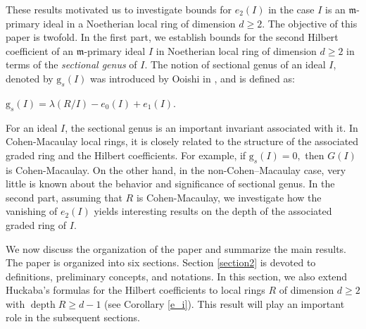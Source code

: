 \documentclass[reqno,a4paper,dvipsnames]{amsart}
\newcommand{\m}{\mathfrak{m} }
\newcommand{\depth}{\operatorname{depth}}
\theoremstyle{definition}
\begin{document}
  These results motivated us to investigate   bounds for $e_2(I)$  in the case $I$ is an $\m$-primary ideal  in a Noetherian local ring of dimension $d \geq 2$.  
The  objective of this paper is twofold. In the first part, we  establish bounds for the second Hilbert coefficient  of an $\m$-primary ideal $I$ in  Noetherian local ring of dimension $d \geq 2$ in terms of the \textit{sectional genus}  of $I$.  The notion of sectional genus of an ideal $I$, denoted by $\mathrm{g}_{s}(I)$ was introduced by Ooishi in \cite{ooishi},  and is defined as:
 \begin{center}
     $\mathrm{g}_{s}(I)=\lambda(R/I)-e_{0}(I)+e_{1}(I).$
 \end{center} 
 For an ideal $I$, the sectional genus is  an important invariant associated with it. In Cohen-Macaulay local rings, it is closely related to  the structure of the associated graded ring and the Hilbert coefficients. For example, if $\mathrm{g}_{s}(I)=0,$ then $G(I)$ is Cohen-Macaulay. On the other hand, in the  non-Cohen–Macaulay case, very little  is known about the behavior and significance of sectional genus.
In the second part, assuming that $R$ is Cohen-Macaulay, we investigate how the vanishing of $e_{2}(I)$  yields interesting results on the depth of the associated graded ring of $I.$  

We now discuss the organization of the paper and  summarize  the main results.  The paper is organized into six sections.
Section \ref{section2} is devoted to definitions, preliminary concepts, and notations.
 In this section, we also  extend Huckaba's formulas for the Hilbert coefficients 
 \cite[Corollary 2.10]{sam} to  local rings $R$ of dimension $d \geq 2$ with $\depth R \geq d-1$ (see Corollary \ref{e_i}). This result will play an important role  in the subsequent sections. 
\end{document}
